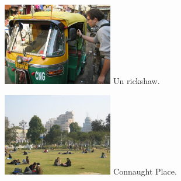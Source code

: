 \begin{multicols}{2}
\hspace*{-0.65cm}
\includegraphics[width=4.8cm]{articles/Des-indiens-dans-la-ville/ricksaw.jpg}
Un rickshaw.

\hspace*{-0.65cm}
\includegraphics[width=4.8cm]{articles/Des-indiens-dans-la-ville/connaughtplace.jpg}
Connaught Place.

\end{multicols}


